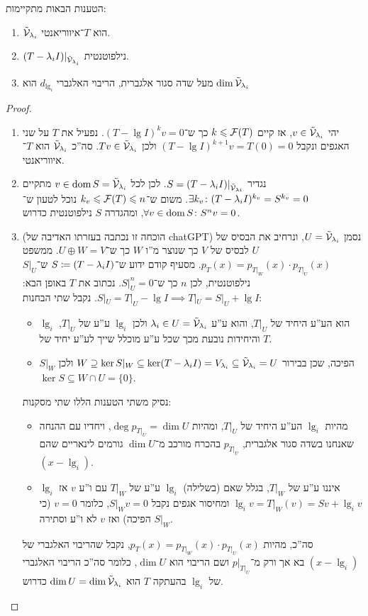 \documentclass[name=רשימות אלגברה לינארית 2א]{../../../tex/classes/megasumPreamble}
\begin{document}
	\begin{Theorem}הטענות הבאות מתקיימות: 
		\begin{enumerate}
			\item $\tilde {\mathcal{V}}_{\lambda_i}$ הוא $T$־איווריאנטי. 
			\item $(T - \lambda_i I)|_{\tilde {\mathcal{V}}_{\lambda_i}}$ נילפוטנטית. 
			\item מעל שדה סגור אלגברית, הריבוי האלגברי $d_{\lg_i}$ הוא $\dim \tilde {\mathcal{V}}_{\lambda_i}$
		\end{enumerate}
	\end{Theorem}
	\begin{proof}\,
		\begin{enumerate}
			\item יהי $v \in \tilde {\mathcal{V}}_{\lambda_i}$, אז קיים $k \leqslant \mathcal{F}(T)$ כך ש־$(T - \lg I)^{k}v = 0$. נפעיל את $T$ על שני האגפים ונקבל $(T - \lg I)^{k + 1}v = T(0) = 0$ ולכן $Tv \in \tilde {\mathcal{V}}_{\lambda_i}$. סה''כ $\tilde {\mathcal{V}}_{\lambda_i}$ הוא $T$־איווריאנטי. 
			\item נגדיר $S = (T - \lambda_i I)|_{\tilde {\mathcal{V}}_{\lambda i}}$. לכן לכל $v \in \operatorname{dom} S = \tilde {\mathcal{V}}_{\lambda_i}$ מתקיים $\exists k_v \colon (T - \lambda_i I)^{k_v} = S^{k_v} = 0$. משום ש־$k_v \leqslant \mathcal{F}(T) \leqslant n$ נוכל לטעון ש־$\forall v \in \operatorname{dom} S \colon S^{n}v = 0$, ומהגדרה $S$ נילפוטנטית כדרוש. 
			\item (הוכחה זו נכתבה בעזרתו האדיבה של chatGPT) נסמן $U = \tilde {\mathcal{V}}_{\lambda_i}$, ונרחיב את הבסיס של $U$ לבסיס של $V$ כך שנוצר מ''ו $W$ כך ש־$U \oplus W = V$. ממשפט $p_T(x) = p_{T|_W}(x) \cdot p_{T|_U}(x)$. מסעיף קודם ידוע ש־$S\coloneqq (T - \lambda_i I)$ ש־$S|_{U}$ נילפוטנטית, לכן $n$ כך ש־$S|_{U}^{n} = 0$. נכתוב את $T$ באופן הבא: $S|_{U} = T|_U - \lg I \implies T|_U = S|_{U} + \lg I$. נקבל שתי הבחנות: 
			\begin{itemize}
				\item $\lg_i$ הוא הע''ע היחיד של $T|_U$, והוא ע''ע $\lambda_i \in U = \tilde {\mathcal{V}}_{\lambda_i}$ ולכן $\lg_i$ ע''ע של $T|_U$, והיחידות נובעת מכך שכל ע''ע מוכלל שייך לע''ע יחיד של $T$. 
				\item $S|_W$ הפיכה, שכן בבירור $W \supseteq \ker S|_W \subseteq \ker(T - \lambda_i I) = V_{\lambda_i} \subseteq \tilde {\mathcal{V}}_{\lambda_i} = U$ ולכן $\ker S \subseteq W \cap U = \{0\}$. 
			\end{itemize}
			נסיק משתי הטענות הללו שתי מסקנות: 
			\begin{itemize}
				\item מהיות $\lg_i$ הע''ע היחיד של $T|_U$, ומהיות $\deg p_{T|_U} = \dim U$, ויחדיו עם ההנחה שאנחנו בשדה סגור אלגברית, $p_{T|_U}$ בהכרח מורכב מ־$\dim U$ גורמים לינאריים שהם $(x - \lg_i)$. 
				\item $\lg_i$ איננו ע''ע של $T|_W$, בגלל שאם (בשלילה) $\lg_i$ ע''ע של $T|_W$ עם ו''ע $v$ אז $\lg_i v = T|_W(v) = Sv + \lg_i v$ ומחיסור אגפים נקבל $S|_Wv = 0$, כלומר $v = 0$ (כי $S|_W$ הפיכה) ואז $v$ לא ו''ע וסתירה. 
			\end{itemize}
			סה''כ, מהיות $p_T(x) = p_{T|_W}(x) \cdot p_{T|_U}(x)$, נקבל שהריבוי האלגברי של $(x - \lg_i)$ בא אך ורק מ־$p|_{T|_U}$ ושם הריבוי הוא $\dim U$, כלומר סה''כ הריבוי האלגברי של $\lg_i$ בהעתקה $T$ הוא $\dim U = \dim \tilde {\mathcal{V}}_{\lambda_i}$ כדרוש. 
		\end{enumerate}
	\end{proof}
\end{document}
